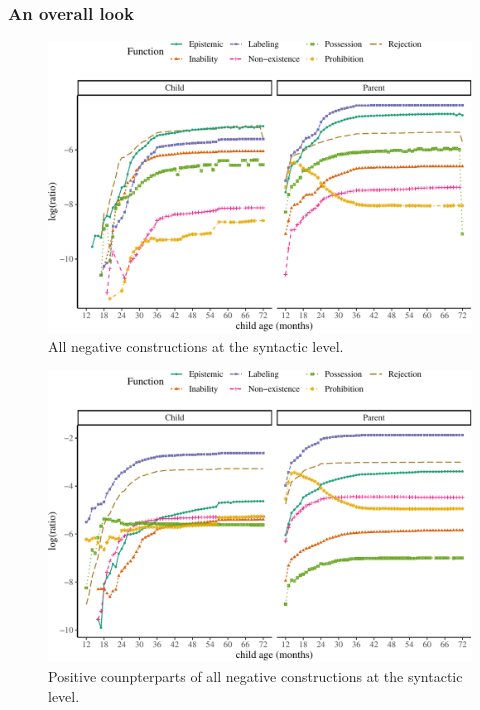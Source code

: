 \documentclass[
  english,
  man,floatsintext]{apa6}
\begin{document}
\hypertarget{an-overall-look}{%
\subsubsection{An overall look}\label{an-overall-look}}

\begin{figure}[H]

{\centering \includegraphics{neg_construction_article_files/figure-latex/allneg-1} 

}

\caption{All negative constructions at the syntactic level.}\label{fig:allneg}
\end{figure}

\begin{figure}[H]

{\centering \includegraphics{neg_construction_article_files/figure-latex/allpos-1} 

}

\caption{Positive counpterparts of all negative constructions at the syntactic level.}\label{fig:allpos}
\end{figure}
\end{document}
